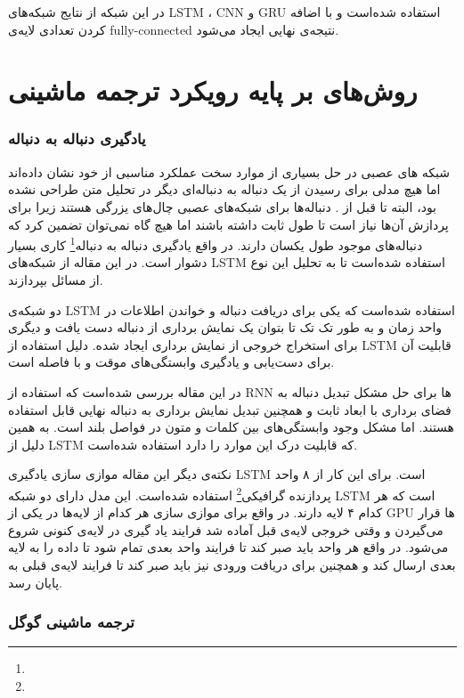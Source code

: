 \documentclass[12pt, a4paper, oneside]{report}
\begin{document}
در این شبکه از نتایج شبکه‌های
LSTM
،
CNN
و 
GRU
استفاده شده‌است و با اضافه کردن تعدادی لایه‌ی
fully-connected
نتیجه‌ی نهایی ایجاد می‌شود.

\section{روش‌های بر پایه رویکرد ترجمه ماشینی}

\subsubsection{یادگیری دنباله به دنباله}
شبکه های عصبی در حل بسیاری از موارد سخت عملکرد مناسبی از خود نشان داده‌اند اما هیچ مدلی برای رسیدن از
یک دنباله به دنباله‌ای دیگر  در تحلیل متن طراحی نشده بود، البته تا قبل از
\cite{sutskever2014sequence}.
دنباله‌ها برای شبکه‌های عصبی چال‌های یزرگی هستند زیرا برای پردازش آن‌ها نیاز است تا طول ثابت داشته باشند اما
هیچ گاه نمی‌توان تضمین کرد که دنباله‌های موجود طول یکسان دارند. در واقع
یادگیری دنباله به دنباله\footnote{}
کاری بسیار دشوار است. در این مقاله از شبکه‌های
LSTM
استفاده شده‌است تا به تحلیل این نوع از مسائل بپردازند.

دو شبکه‌ی
LSTM
استفاده شده‌است که یکی برای دریافت دنباله و خواندن اطلاعات در واحد زمان و به طور تک تک تا بتوان یک
نمایش برداری از دنباله دست یافت و دیگری برای استخراج خروجی از نمایش برداری ایجاد شده.
دلیل استفاده از
LSTM
قابلیت آن برای دست‌یابی و یادگیری وابستگی‌های موقت و با فاصله است.

در این مقاله بررسی شده‌است که استفاده از
RNN
ها برای حل مشکل تبدیل دنباله به 
فضای برداری با ابعاد ثابت
و همچنین تبدیل نمایش برداری به دنباله نهایی قابل استفاده هستند. اما مشکل وجود وابستگی‌های بین کلمات و متون در
فواصل بلند است. به همین دلیل از
LSTM
که قابلیت درک این موارد را دارد استفاده شده‌است.

نکته‌ی دیگر این مقاله موازی سازی یادگیری
LSTM
است. برای این کار از ۸
واحد پردازنده گرافیکی\footnote{}
استفاده شده‌است. این مدل دارای دو شبکه
LSTM
است که هر کدام ۴ لایه دارند. در واقع برای موازی سازی هر کدام از لایه‌ها در یکی از
GPU
ها قرار می‌گیردن و وقتی خروجی لایه‌ی قبل آماده شد فرایند یاد گیری در لایه‌ی کنونی شروع می‌شود.
در واقع هر واحد باید صبر کند تا فرایند واحد بعدی تمام شود تا داده را به لایه بعدی ارسال کند و همچنین برای
دریافت ورودی نیز باید صبر کند تا فرایند لایه‌ی قبلی به پایان رسد.

\subsubsection{ترجمه ماشینی گوگل}
\end{document}
